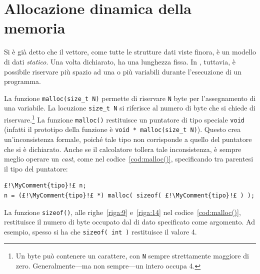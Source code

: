	\section{Allocazione dinamica della memoria}
	\label{sec:malloc()}
Si è già detto che il vettore, come tutte le strutture dati viste finora, è un modello di dati \emph{statico}. Una volta dichiarato, ha una lunghezza fissa.
In , tuttavia, è possibile riservare più spazio ad una o più variabili durante l'esecuzione di un programma.

La funzione \lstinline!malloc(size_t N)! permette di riservare \lstinline!N! \si{byte} per l'assegnamento di una variabile.
La locuzione \lstinline!size_t N! si riferisce al numero di byte che si chiede di riservare.\footnote{Un \si{byte} può contenere un carattere, con \lstinline!N! sempre strettamente maggiore di zero.
Generalmente---ma non sempre---un intero occupa \SI{4}{\byte}.}
La funzione \lstinline!malloc()! restituisce un puntatore di tipo speciale \lstinline!void! (infatti il prototipo della funzione è \lstinline!void * malloc(size_t N)!).
Questo crea un'inconsistenza formale, poiché tale tipo non corrisponde a quello del puntatore che si è dichiarato.
Anche se il calcolatore tollera tale inconsistenza, è sempre meglio operare un \emph{cast}, come nel codice~\ref{cod:malloc()}, specificando tra parentesi il tipo del puntatore:
\begin{lstlisting}
£!\MyComment{tipo}!£ n;
n = (£!\MyComment{tipo}!£ *) malloc( sizeof( £!\MyComment{tipo}!£ ) );
\end{lstlisting}
La funzione \lstinline!sizeof(!\lstinline!)!, alle righe~\ref{riga:9} e~\ref{riga:14} nel codice~\ref{cod:malloc()}, restituisce il numero di \si{byte} occupato dal  di dato specificato come argomento.
Ad esempio, spesso si ha che \lstinline!sizeof( int )! restituisce il valore \num{4}.

